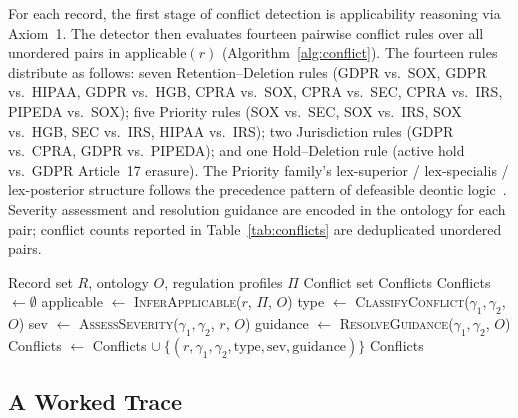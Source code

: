\documentclass{ieeeaccess}
\begin{document}
For each record, the first stage of conflict detection is applicability reasoning via Axiom~1. The detector then evaluates fourteen pairwise conflict rules over all unordered pairs in $\mathrm{applicable}(r)$ (Algorithm~\ref{alg:conflict}). The fourteen rules distribute as follows: seven Retention--Deletion rules (GDPR vs.\ SOX, GDPR vs.\ HIPAA, GDPR vs.\ HGB, CPRA vs.\ SOX, CPRA vs.\ SEC, CPRA vs.\ IRS, PIPEDA vs.\ SOX); five Priority rules (SOX vs.\ SEC, SOX vs.\ IRS, SOX vs.\ HGB, SEC vs.\ IRS, HIPAA vs.\ IRS); two Jurisdiction rules (GDPR vs.\ CPRA, GDPR vs.\ PIPEDA); and one Hold--Deletion rule (active hold vs.\ GDPR Article~17 erasure). The Priority family's lex-superior / lex-specialis / lex-posterior structure follows the precedence pattern of defeasible deontic logic~\cite{governatori2013}. Severity assessment and resolution guidance are encoded in the ontology for each pair; conflict counts reported in Table~\ref{tab:conflicts} are deduplicated unordered pairs.

\begin{algorithm}[t]
\caption{Conflict Detection}
\label{alg:conflict}
\begin{algorithmic}[1]
\Require Record set $R$, ontology $O$, regulation profiles $\Pi$
\Ensure Conflict set Conflicts
\State Conflicts $\gets \emptyset$
    \State applicable $\gets$ \textsc{InferApplicable}($r$, $\Pi$, $O$)
            \State type $\gets$ \textsc{ClassifyConflict}($\gamma_1, \gamma_2$, $O$)
            \State sev $\gets$ \textsc{AssessSeverity}($\gamma_1, \gamma_2$, $r$, $O$)
            \State guidance $\gets$ \textsc{ResolveGuidance}($\gamma_1, \gamma_2$, $O$)
            \State Conflicts $\gets$ Conflicts $\cup\ \{(r, \gamma_1, \gamma_2, \mathrm{type}, \mathrm{sev}, \mathrm{guidance})\}$
        \EndIf
    \EndFor
\EndFor
\State \Return Conflicts
\end{algorithmic}
\end{algorithm}

\subsection{A Worked Trace}
\end{document}

